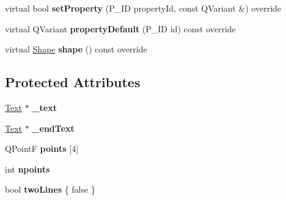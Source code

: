\begin{DoxyCompactItemize}
\item 
\mbox{\label{class_ms_1_1_text_line_base_segment_a947690ad81d275308afdf8eaede89385}} 
virtual bool {\bfseries set\+Property} (P\+\_\+\+ID property\+Id, const Q\+Variant \&) override
\item 
\mbox{\label{class_ms_1_1_text_line_base_segment_a07181fd0b85bfd005c24d3b7af60612f}} 
virtual Q\+Variant {\bfseries property\+Default} (P\+\_\+\+ID id) const override
\item 
\mbox{\label{class_ms_1_1_text_line_base_segment_ac8f6ed6e7ba5918567dfeed2bd3476c7}} 
virtual \hyperlink{class_ms_1_1_shape}{Shape} {\bfseries shape} () const override
\end{DoxyCompactItemize}
\subsection*{Protected Attributes}
\begin{DoxyCompactItemize}
\item 
\mbox{\label{class_ms_1_1_text_line_base_segment_ad503433d9c3cd2a94c02f52174daf3eb}} 
\hyperlink{class_ms_1_1_text}{Text} $\ast$ {\bfseries \+\_\+text}
\item 
\mbox{\label{class_ms_1_1_text_line_base_segment_ab7da0271bb6d1a87c4b6fc908e960075}} 
\hyperlink{class_ms_1_1_text}{Text} $\ast$ {\bfseries \+\_\+end\+Text}
\item 
\mbox{\label{class_ms_1_1_text_line_base_segment_a4dc59708fff60f8cd914e394ee043986}} 
Q\+PointF {\bfseries points} \mbox{[}4\mbox{]}
\item 
\mbox{\label{class_ms_1_1_text_line_base_segment_a8cd1940b1b350b2a67b9702a1b492d87}} 
int {\bfseries npoints}
\item 
\mbox{\label{class_ms_1_1_text_line_base_segment_aa2c9c490d2176133de7f85d07d74f449}} 
bool {\bfseries two\+Lines} \{ false \}
\end{DoxyCompactItemize}
